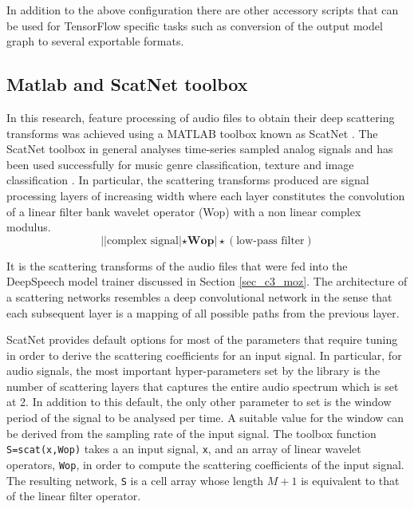 In addition to the above configuration there are other accessory scripts that can be used for TensorFlow specific tasks such as conversion of the output model graph to several exportable formats.

\subsection{Matlab and ScatNet toolbox}
In this research, feature processing of audio files to obtain their deep scattering transforms was achieved using a MATLAB toolbox known as ScatNet \citep{anden2014scatnet}.  The ScatNet toolbox in general analyses time-series sampled analog signals and has been used successfully for music genre classification, texture and image classification \citep{anden2011multiscale,sifre2013rotation,sifre2014rigid}.  In particular, the scattering transforms produced are signal processing layers of increasing width where each layer constitutes the convolution of a linear filter bank wavelet operator (Wop) with a non linear complex modulus.  
\begin{equation}
    ||\text{complex signal}|\star \mathbf{Wop}|\star(\text{low-pass filter}) \label{eqn_c3_scat00}
\end{equation}

It is the scattering transforms of the audio files that were fed into the DeepSpeech model trainer discussed in Section \ref{sec_c3_moz}.  The architecture of a scattering networks resembles a deep convolutional network in the sense that each subsequent layer is a mapping of all possible paths from the previous layer.

ScatNet provides default options for most of the parameters that require tuning in order to derive the scattering coefficients for an input signal.  In particular, for audio signals, the most important hyper-parameters set by the library is the number of scattering layers that captures the entire audio spectrum which is set at 2.  In addition to this default, the only other parameter to set is the window period of the signal to be analysed per time.  A suitable value for the window can be derived from the sampling rate of the input signal.  The toolbox function \texttt{S=scat(x,Wop)} takes a an input signal, \texttt{x},  and an array of linear wavelet operators, \texttt{Wop}, in order to compute the scattering coefficients of the input signal.   The resulting network, \texttt{S} is a cell array whose length $M+1$ is equivalent to that of the linear filter operator.  

